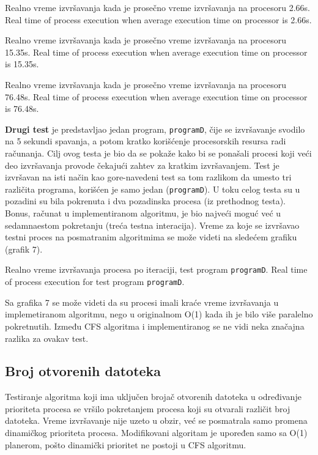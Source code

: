     {Realno vreme izvršavanja kada je prosečno vreme izvršavanja na procesoru 2.66s.}
    {Real time of process execution when average execution time on processor is 2.66s.}

    {Realno vreme izvršavanja kada je prosečno vreme izvršavanja na procesoru 15.35s.}
    {Real time of process execution when average execution time on processor is 15.35s.}

    {Realno vreme izvršavanja kada je prosečno vreme izvršavanja na procesoru 76.48s.}
    {Real time of process execution when average execution time on processor is 76.48s.}

\textbf{Drugi test} je predstavljao jedan program, \texttt{programD}, čije se izvršavanje svodilo na 5 sekundi spavanja, a potom kratko korišćenje procesorskih resursa radi računanja. Cilj ovog testa je bio da se pokaže kako bi se ponašali procesi koji veći deo izvršavanja provode čekajući zahtev za kratkim izvršavanjem. Test je izvršavan na isti način kao gore-navedeni test sa tom razlikom da umesto tri različita programa, korišćen je samo jedan (\texttt{programD}). U toku celog testa su u pozadini su bila pokrenuta i dva pozadinska procesa (iz prethodnog testa). Bonus, računat u implementiranom algoritmu, je bio najveći moguć već u sedamnaestom pokretanju (treća testna interacija). Vreme za koje se izvršavao testni proces na posmatranim algoritmima se može videti na sledećem grafiku (grafik 7).


    {Realno vreme izvršavanja procesa po iteraciji, test program \texttt{programD}.}
    {Real time of process execution for test program \texttt{programD}.}

Sa grafika 7 se može videti da su procesi imali kraće vreme izvršavanja u implemetiranom algoritmu, nego u originalnom O(1) kada ih je bilo više paralelno pokretnutih. Između CFS algoritma i implementiranog se ne vidi neka značajna razlika za ovakav test.

\subsection{Broj otvorenih datoteka}

Testiranje algoritma koji ima uključen brojač otvorenih datoteka u određivanje prioriteta procesa se vršilo pokretanjem procesa koji su otvarali različit broj datoteka. Vreme izvršavanje nije uzeto u obzir, već se posmatrala samo promena dinamičkog prioriteta procesa. Modifikovani algoritam je upoređen samo sa O(1) planerom, pošto dinamički prioritet ne postoji u CFS algoritmu.

